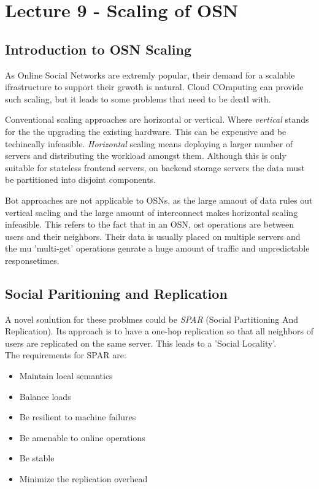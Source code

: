 \section{Lecture 9 - Scaling of OSN} %
\label{sec:lecture_9_scaling_of_osn}

\subsection{Introduction to OSN Scaling}
As Online Social Networks are extremly popular,
their demand for a scalable ifrastructure to support their grwoth is natural.
Cloud COmputing can provide such scaling,
but it leads to some problems that need to be deatl with.

Conventional scaling approaches are horizontal or vertical.
Where \emph{vertical} stands for the the upgrading the existing hardware.
This can be expensive and be techincally infeasible.
\emph{Horizontal} scaling means deploying a larger number of servers
and distributing the workload amongst them.
Although this is only suitable for stateless frontend servers,
on backend storage servers the data must be partitioned into disjoint components.

Bot approaches are not applicable to OSNs,
as the large amaout of data rules out vertical sacling 
and the large amount of interconnect makes horizontal scaling infeasible.
This refers to the fact that in an OSN,
ost operations are between users and their neighbors.
Their data is usually placed on multiple servers
and the mu 'multi-get' operations genrate a huge amount of traffic
and unpredictable responsetimes.

\subsection{Social Paritioning and Replication} %
\label{sub:social_paritioning_and_replication}
A novel soulution for these problmes could be \emph{SPAR} (Social Partitioning And Replication).
Its approach is to have a one-hop replication
so that all neighbors of users are replicated on the same server.
This leads to a 'Social Locality'.\\
The requirements for SPAR are:
	\begin{itemize}
		\item Maintain local semantics
		\item Balance loads
		\item Be resilient to machine failures
		\item Be amenable to online operations
		\item Be stable
		\item Minimize the replication overhead
	\end{itemize}

